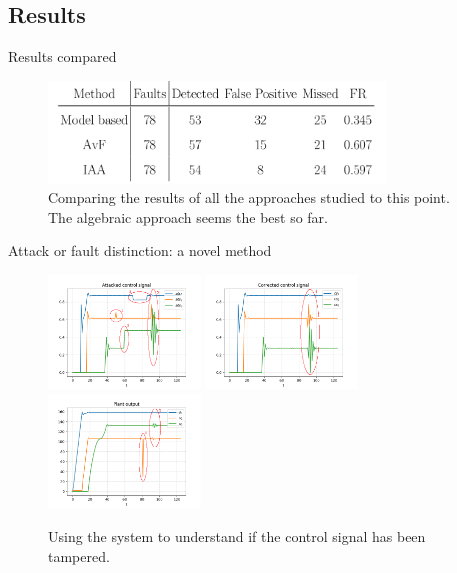 \documentclass{beamer}
\begin{document}
\subsection{Results}
\begin{frame}{Results compared}
	\begin{figure}
		\centering
		\includegraphics[width=0.8\textwidth]{comparison_results.png}
		\caption{Comparing the results of all the approaches studied to this
		point. The algebraic approach seems the best so far.}
	\end{figure}
\end{frame}
\begin{frame}{Attack or fault distinction: a novel method}
	\begin{figure}
		\centering
		\includegraphics[width=0.36\textwidth]{attacked_signal_improved.png}
		\includegraphics[width=0.36\textwidth]{control_signal_improved.png}
		\includegraphics[width=0.36\textwidth]{sensors_improved.png}
		\caption{Using the system to understand if the control signal has been
		tampered.}
	\end{figure}
\end{frame}
\end{document}
